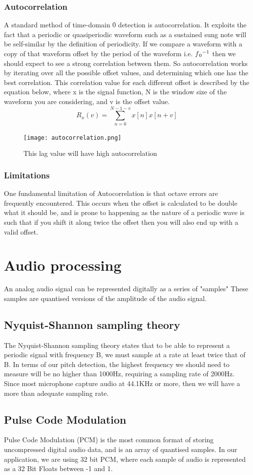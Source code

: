 		\subsubsection{Autocorrelation}
		A standard method of time-domain \f0 detection is autocorrelation\cite{comparativePitchDetection}. It exploits the fact that a periodic or quasiperiodic waveform such as a sustained sung note will be self-similar by the definition of periodicity. If we compare a waveform with a copy of that waveform offset by the period of the waveform i.e. \(\f0 ^{-1}\) then we should expect to see a strong correlation between them. So autocorrelation works by iterating over all the possible offset values, and determining which one has the best correlation. This correlation value for each different offset is described by the equation below, where x is the signal function, N is the window size of the waveform you are considering, and v is the offset value.  \[R_x(v) = \sum_{n=0}^{N-1-v} x[n]x[n+v]\]
		\begin{figure}
			\centering
			\texttt{[image: autocorrelation.png]}
			\caption{This lag value will have high autocorrelation}
		\end{figure}

		\subsubsection{Limitations}
		One fundamental limitation of Autocorrelation is that octave errors are frequently encountered. This occurs when the offset is calculated to be double what it should be, and is prone to happening as the nature of a periodic wave is such that if you shift it along twice the offset then you will also end up with a valid offset.
	
\section{Audio processing}
	An analog audio signal can be represented digitally as a series of "samples" These samples are quantised versions of the amplitude of the audio signal.
	\subsection{Nyquist-Shannon sampling theory}
	The Nyquist-Shannon sampling theory states that to be able to represent a periodic signal with frequency B, we must sample at a rate at least twice that of B. In terms of our pitch detection, the highest frequency we should need to measure will be no higher than 1000Hz, requiring a sampling rate of 2000Hz. Since most microphone capture audio at 44.1KHz or more, then we will have a more than adequate sampling rate.
	\subsection{Pulse Code Modulation}
	Pulse Code Modulation (PCM) is the most common format of storing uncompressed digital audio data, and is an array of quantised samples. In our application, we are using 32 bit PCM, where each sample of audio is represented as a 32 Bit Floats between -1 and 1.

